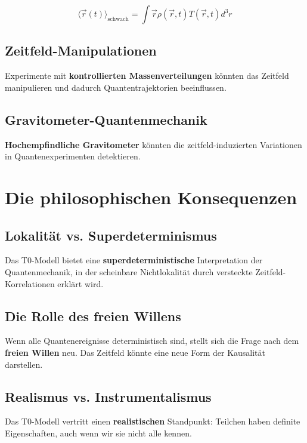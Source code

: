 \documentclass[12pt,a4paper]{report}
\begin{document}
	\begin{equation}
		\langle\vec{r}(t)\rangle_{\text{schwach}} = \int \vec{r} \rho(\vec{r},t) T(\vec{r},t) d^3r
	\end{equation}
	
	\subsection{Zeitfeld-Manipulationen}
	
	Experimente mit \textbf{kontrollierten Massenverteilungen} könnten das Zeitfeld manipulieren und dadurch Quantentrajektorien beeinflussen.
	
	\subsection{Gravitometer-Quantenmechanik}
	
	\textbf{Hochempfindliche Gravitometer} könnten die zeitfeld-induzierten Variationen in Quantenexperimenten detektieren.
	
	\section{Die philosophischen Konsequenzen}
	
	\subsection{Lokalität vs. Superdeterminismus}
	
	Das T0-Modell bietet eine \textbf{superdeterministische} Interpretation der Quantenmechanik, in der scheinbare Nichtlokalität durch versteckte Zeitfeld-Korrelationen erklärt wird.
	
	\subsection{Die Rolle des freien Willens}
	
	Wenn alle Quantenereignisse deterministisch sind, stellt sich die Frage nach dem \textbf{freien Willen} neu. Das Zeitfeld könnte eine neue Form der Kausalität darstellen.
	
	\subsection{Realismus vs. Instrumentalismus}
	
	Das T0-Modell vertritt einen \textbf{realistischen} Standpunkt: Teilchen haben definite Eigenschaften, auch wenn wir sie nicht alle kennen.
	
\end{document}
